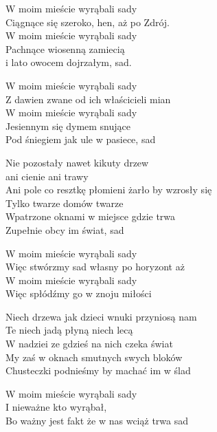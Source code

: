 \begin{text}
    \chordfill
    W moim mieście wyrąbali sady\\
    Ciągnące się szeroko, hen, aż po Zdrój.\\
    W moim mieście wyrąbali sady\\
    Pachnące wiosenną zamiecią\\
    i lato owocem dojrzałym, sad.

    W moim mieście wyrąbali sady\\
    Z dawien zwane od ich właścicieli mian\\
    W moim mieście wyrąbali sady\\
    Jesiennym się dymem snujące\\
    Pod śniegiem jak ule w pasiece, sad

    Nie pozostały nawet kikuty drzew\\
    ani cienie ani trawy\\
    Ani pole co resztkę płomieni żarło by wzrosły się\\
    Tylko twarze domów twarze\\
    Wpatrzone oknami w miejsce gdzie trwa\\
    Zupełnie obcy im świat, sad

    W moim mieście wyrąbali sady\\
    Więc stwórzmy sad własny po horyzont aż\\
    W moim mieście wyrąbali sady\\
    Więc spłódźmy go w znoju miłości

    Niech drzewa jak dzieci wnuki przyniosą nam\\
    Te niech jadą płyną niech lecą\\
    W nadziei ze gdzieś na nich czeka świat\\
    My zaś w oknach smutnych swych bloków\\
    Chusteczki podnieśmy by machać im w ślad

    W moim mieście wyrąbali sady\\
    I nieważne kto wyrąbał,\\
    Bo ważny jest fakt że w nas wciąż trwa sad
\end{text}
